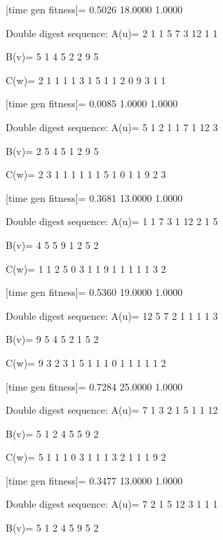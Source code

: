 [time gen fitness]=
    0.5026   18.0000    1.0000

Double digest sequence:
A(u)=
     2     1     1     5     7     3    12     1     1

B(v)=
     5     1     4     5     2     2     9     5

C(w)=
     2     1     1     1     1     3     1     5     1     1     2     0     9     3     1     1

[time gen fitness]=
    0.0085    1.0000    1.0000

Double digest sequence:
A(u)=
     5     1     2     1     1     7     1    12     3

B(v)=
     2     5     4     5     1     2     9     5

C(w)=
     2     3     1     1     1     1     1     1     5     1     0     1     1     9     2     3

[time gen fitness]=
    0.3681   13.0000    1.0000

Double digest sequence:
A(u)=
     1     1     7     3     1    12     2     1     5

B(v)=
     4     5     5     9     1     2     5     2

C(w)=
     1     1     2     5     0     3     1     1     9     1     1     1     1     1     3     2

[time gen fitness]=
    0.5360   19.0000    1.0000

Double digest sequence:
A(u)=
    12     5     7     2     1     1     1     1     3

B(v)=
     9     5     4     5     2     1     5     2

C(w)=
     9     3     2     3     1     5     1     1     1     0     1     1     1     1     1     2

[time gen fitness]=
    0.7284   25.0000    1.0000

Double digest sequence:
A(u)=
     7     1     3     2     1     5     1     1    12

B(v)=
     5     1     2     4     5     5     9     2

C(w)=
     5     1     1     1     0     3     1     1     1     3     2     1     1     1     9     2

[time gen fitness]=
    0.3477   13.0000    1.0000

Double digest sequence:
A(u)=
     7     2     1     5    12     3     1     1     1

B(v)=
     5     1     2     4     5     9     5     2

